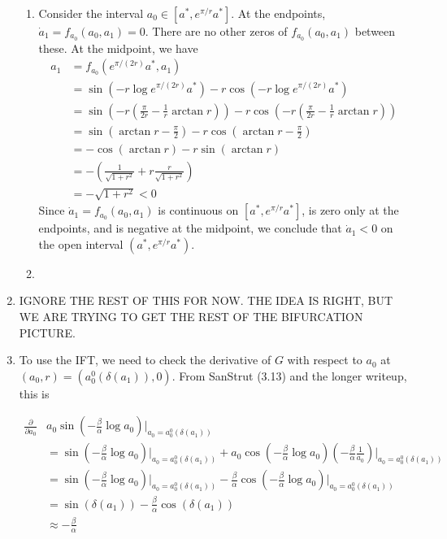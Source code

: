 \documentclass[12pt]{article}
\begin{document}
\begin{enumerate}
\begin{enumerate}
   \item Consider the interval $a_0 \in [a^*, e^{\pi / r}a^*]$. At the endpoints, $\dot a_1 = f_{a_0}(a_0, a_1) = 0$. There are no other zeros of $f_{a_0}(a_0, a_1)$ between these. At the midpoint, we have
   \begin{align*}
   a_1 &= f_{a_0}(e^{\pi / (2r)}a^*, a_1) \\
   &= \sin(-r \log e^{\pi / (2r)} a^* ) - r \cos( -r \log e^{\pi / (2r)} a^* ) \\
   &= \sin\left(-r \left( \frac{\pi}{2r} - \frac{1}{r} \arctan r \right) \right) - r \cos\left(-r \left( \frac{\pi}{2r} - \frac{1}{r} \arctan r \right) \right) \\
   &= \sin\left(\arctan r - \frac{\pi}{2} \right) - r \cos\left(\arctan r - \frac{\pi}{2} \right) \\
   &= -\cos\left(\arctan r \right) - r \sin\left(\arctan r\right) \\
   &= - \left( \frac{1}{\sqrt{1+r^2}} + r \frac{r}{\sqrt{1+r^2}}  \right) \\
   &= -\sqrt{1 + r^2} < 0
   \end{align*}
   Since $\dot a_1 = f_{a_0}(a_0, a_1)$ is continuous on $[a^*, e^{\pi / r}a^*]$, is zero only at the endpoints, and is negative at the midpoint, we conclude that $\dot a_1 < 0$ on the open interval $(a^*, e^{\pi / r}a^*)$.

   \item 

\end{enumerate}










\item IGNORE THE REST OF THIS FOR NOW. THE IDEA IS RIGHT, BUT WE ARE TRYING TO GET THE REST OF THE BIFURCATION PICTURE.

\item To use the IFT, we need to check the derivative of $G$ with respect to $a_0$ at $(a_0, r) = (a_0^0(\delta(a_1)), 0)$. From SanStrut (3.13) and the longer writeup, this is 

\begin{align*}
\frac{\partial}{\partial a_0} &a_0 \sin \left( -\frac{\beta}{\alpha} \log a_0 \right)\Big|_{a_0 = a_0^0(\delta(a_1))} \\
&= \sin \left( - \frac{\beta}{\alpha} \log a_0 \right)\Big|_{a_0 = a_0^0(\delta(a_1))}  + a_0 \cos \left( - \frac{\beta}{\alpha} \log a_0 \right)\left( -\frac{\beta}{\alpha} \frac{1}{a_0} \right) \Big|_{a_0 = a_0^0(\delta(a_1))} \\
&= \sin \left( - \frac{\beta}{\alpha} \log a_0 \right) \Big|_{a_0 = a_0^0(\delta(a_1))}  -\frac{\beta}{\alpha} \cos \left( - \frac{\beta}{\alpha} \log a_0 \right) \Big|_{a_0 = a_0^0(\delta(a_1))} \\
&= \sin \left( \delta(a_1) \right) -\frac{\beta}{\alpha} \cos \left( \delta(a_1) \right) \\
&\approx -\frac{\beta}{\alpha}
\end{align*}


\end{enumerate}
\end{document}
